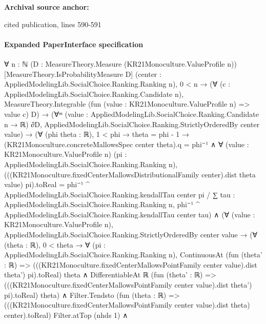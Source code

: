 \documentclass[10pt]{article}
\begin{document}
\textbf{Archival source anchor:} {\footnotesize\raggedright cited publication, lines 590-\allowbreak{}591\par}
\paragraph{Expanded PaperInterface specification}
\begin{ReviewVerbatim}
∀ {n : ℕ} (D : MeasureTheory.Measure (KR21Monoculture.ValueProfile n)) [MeasureTheory.IsProbabilityMeasure D]
  (center : AppliedModelingLib.SocialChoice.Ranking.Ranking n),
  0 < n →
    (∀ (c : AppliedModelingLib.SocialChoice.Ranking.Candidate n),
        MeasureTheory.Integrable (fun (value : KR21Monoculture.ValueProfile n) => value c) D) →
      (∀ᵐ (value : AppliedModelingLib.SocialChoice.Ranking.Candidate n → ℝ) ∂D,
          AppliedModelingLib.SocialChoice.Ranking.StrictlyOrderedBy center value) →
        (∀ (phi theta : ℝ),
            1 < phi →
              theta = phi - 1 →
                (KR21Monoculture.concreteMallowsSpec center theta).q = phi⁻¹ ∧
                  ∀ (value : KR21Monoculture.ValueProfile n) (pi : AppliedModelingLib.SocialChoice.Ranking.Ranking n),
                    (((KR21Monoculture.fixedCenterMallowsDistributionalFamily center).dist theta value) pi).toReal =
                      phi⁻¹ ^ AppliedModelingLib.SocialChoice.Ranking.kendallTau center pi /
                        ∑ tau : AppliedModelingLib.SocialChoice.Ranking.Ranking n,
                          phi⁻¹ ^ AppliedModelingLib.SocialChoice.Ranking.kendallTau center tau) ∧
          (∀ (value : KR21Monoculture.ValueProfile n),
              AppliedModelingLib.SocialChoice.Ranking.StrictlyOrderedBy center value →
                (∀ (theta : ℝ),
                    0 < theta →
                      ∀ (pi : AppliedModelingLib.SocialChoice.Ranking.Ranking n),
                        ContinuousAt
                            (fun (theta' : ℝ) =>
                              (((KR21Monoculture.fixedCenterMallowsPointFamily center value).dist theta') pi).toReal)
                            theta ∧
                          DifferentiableAt ℝ
                            (fun (theta' : ℝ) =>
                              (((KR21Monoculture.fixedCenterMallowsPointFamily center value).dist theta') pi).toReal)
                            theta) ∧
                  Filter.Tendsto
                      (fun (theta : ℝ) =>
                        (((KR21Monoculture.fixedCenterMallowsPointFamily center value).dist theta) center).toReal)
                      Filter.atTop (nhds 1) ∧

\end{ReviewVerbatim}
\end{document}
